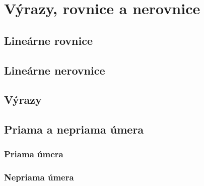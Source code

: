 \chapter{Výrazy, rovnice a nerovnice}
\label{chap:rovnice}

\section{Lineárne rovnice}

\section{Lineárne nerovnice}

\section{Výrazy}

\newpage

\section{Priama a nepriama úmera}

\subsection{Priama úmera}

\subsection{Nepriama úmera}